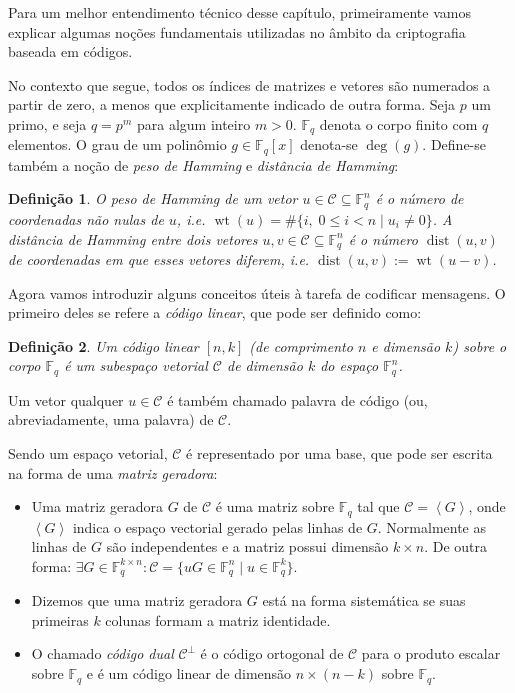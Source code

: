 \documentclass{SBCbookchapter}
\newcommand{\F}{\mathbb{F}}
\DeclareMathOperator{\dist}{dist}
\DeclareMathOperator{\wt}{wt}
\newtheorem{definition}{Definição}{\bfseries}{\itshape}
\begin{document}
\begin{otherlanguage}{brazilian}
Para um melhor entendimento técnico desse capítulo, primeiramente vamos explicar algumas noções fundamentais utilizadas no âmbito da criptografia baseada em códigos.

No contexto que segue, todos os índices de matrizes e vetores são numerados a partir de zero, a menos que explicitamente indicado de outra forma. Seja $p$ um primo, e seja $q = p^m$ para algum inteiro $m > 0$. $\F_q$ denota o corpo finito com $q$ elementos. O grau de um polinômio $g \in \F_q[x]$ denota-se $\deg(g)$. Define-se também a noção de \emph{peso de Hamming} e \emph{distância de Hamming}:

\begin{definition}\label{def:hamming}
O \emph{peso de Hamming} de um vetor $u \in \mathcal{C} \subseteq \F_q^n$ é o número de coordenadas não nulas de $u$, i.e. $\wt(u) = \#\{i, \; 0 \leqslant i < n \mid u_i \neq 0\}$. A \emph{distância de Hamming} entre dois vetores $u, v \in \mathcal{C} \subseteq \F_q^n$ é o número $\dist(u, v)$ de coordenadas em que esses vetores diferem, i.e. $\dist(u, v) := \wt(u - v)$.
\end{definition}


Agora vamos introduzir alguns conceitos úteis à tarefa de codificar mensagens. O
primeiro deles se refere a \emph{código linear}, que pode ser definido como:

\begin{definition}\label{def:code}
Um código linear $[n,k]$ (de comprimento $n$ e dimensão $k$) sobre o corpo $\F_q$ é um subespaço vetorial $\mathcal{C}$ de dimensão $k$ do espaço $\F_q^n$.
\end{definition}
Um vetor qualquer $u \in \mathcal{C}$ é também chamado palavra de código (ou, abreviadamente, uma palavra) de $\mathcal{C}$.

Sendo um espaço vetorial, $\mathcal{C}$ é representado por uma base, que pode ser escrita na forma de uma \emph{matriz geradora}:

\begin{itemize}
    \item Uma matriz geradora $G$ de $\mathcal{C}$ é uma matriz sobre $\F_q$ tal que $\mathcal{C} = \left\langle G \right\rangle$, onde $\left\langle G \right\rangle$  indica o espaço vectorial gerado pelas linhas de $G$. Normalmente as linhas de $G$ são independentes e a matriz possui dimensão $k \times n$. De outra forma: $\exists G \in \F_q^{k \times n} : \mathcal{C} = \{ u G \in \F_q^n \mid u \in \F_q^k \}$.
    \item Dizemos que uma matriz geradora $G$ está na forma sistemática se suas primeiras $k$ colunas formam a matriz identidade.
    \item O chamado \emph{código dual} $\mathcal{C}^\bot$ é o código ortogonal de $\mathcal{C}$ para o produto escalar sobre $\F_q$ e é um código linear de dimensão $n \times (n - k)$ sobre $\F_q$.
\end{itemize}


\end{otherlanguage}
\end{document}
